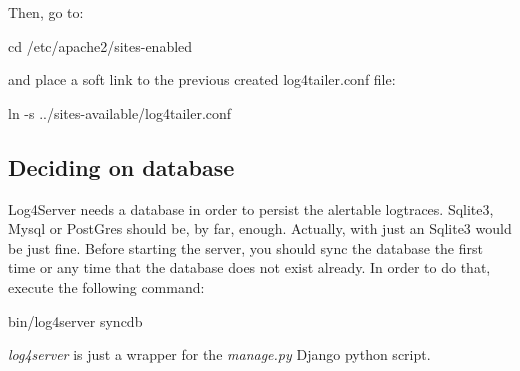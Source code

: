 Then, go to:

\begin{cmd}
    cd /etc/apache2/sites-enabled
\end{cmd}
and place a soft link to the previous created log4tailer.conf file:

\begin{cmd}
    ln -s ../sites-available/log4tailer.conf
\end{cmd}


\subsection{Deciding on database}

Log4Server needs a database in order to persist the alertable logtraces. 
Sqlite3, Mysql or PostGres should be, by far, enough. Actually, with just an
Sqlite3 would be just fine. Before starting the server, you should
sync the database the first time or any time that the database does not exist
already. In order to do that, execute the following command:

\begin{cmd}
   bin/log4server syncdb 
\end{cmd}
\emph{log4server} is just a wrapper for the \emph{manage.py} Django python
script. 

\newpage
